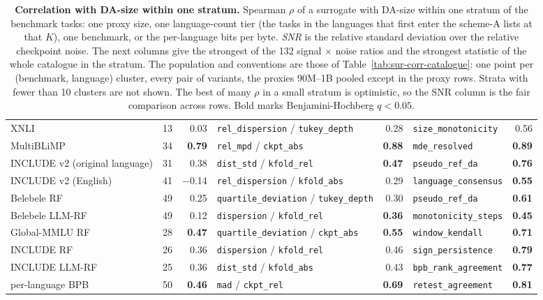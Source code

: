\begin{table}[t]
\begin{adjustbox}{max width=\textwidth}
\begin{tabular}{@{}lrrlrlr@{}}
XNLI & 13 & 0.03 & \texttt{rel\_dispersion} / \texttt{tukey\_depth} & 0.28 & \texttt{size\_monotonicity} & 0.56 \\
MultiBLiMP & 34 & \textbf{0.79} & \texttt{rel\_mpd} / \texttt{ckpt\_abs} & \textbf{0.88} & \texttt{mde\_resolved} & \textbf{0.89} \\
INCLUDE v2 (original language) & 31 & 0.38 & \texttt{dist\_std} / \texttt{kfold\_rel} & \textbf{0.47} & \texttt{pseudo\_ref\_da} & \textbf{0.76} \\
INCLUDE v2 (English) & 41 & $-$0.14 & \texttt{rel\_dispersion} / \texttt{kfold\_abs} & 0.29 & \texttt{language\_consensus} & \textbf{0.55} \\
Belebele RF & 49 & 0.25 & \texttt{quartile\_deviation} / \texttt{tukey\_depth} & 0.30 & \texttt{pseudo\_ref\_da} & \textbf{0.61} \\
Belebele LLM-RF & 49 & 0.12 & \texttt{dispersion} / \texttt{kfold\_rel} & \textbf{0.36} & \texttt{monotonicity\_steps} & \textbf{0.45} \\
Global-MMLU RF & 28 & \textbf{0.47} & \texttt{quartile\_deviation} / \texttt{ckpt\_abs} & \textbf{0.55} & \texttt{window\_kendall} & \textbf{0.71} \\
INCLUDE RF & 26 & 0.36 & \texttt{dispersion} / \texttt{kfold\_rel} & 0.46 & \texttt{sign\_persistence} & \textbf{0.79} \\
INCLUDE LLM-RF & 25 & 0.36 & \texttt{dist\_std} / \texttt{kfold\_abs} & 0.43 & \texttt{bpb\_rank\_agreement} & \textbf{0.77} \\
\midrule
per-language BPB & 50 & \textbf{0.46} & \texttt{mad} / \texttt{ckpt\_rel} & \textbf{0.69} & \texttt{retest\_agreement} & \textbf{0.81} \\
\bottomrule
\end{tabular}
\end{adjustbox}
\caption{\textbf{Correlation with DA-size within one stratum.} Spearman $\rho$ of a surrogate with DA-size within one stratum of the benchmark tasks: one proxy size, one language-count tier (the tasks in the languages that first enter the scheme-A lists at that $K$), one benchmark, or the per-language bits per byte. \emph{SNR} is the relative standard deviation over the relative checkpoint noise. The next columns give the strongest of the 132 signal $\times$ noise ratios and the strongest statistic of the whole catalogue in the stratum. The population and conventions are those of Table~\ref{tab:sur-corr-catalogue}: one point per (benchmark, language) cluster, every pair of variants, the proxies 90M--1B pooled except in the proxy rows. Strata with fewer than 10 clusters are not shown. The best of many $\rho$ in a small stratum is optimistic, so the SNR column is the fair comparison across rows. Bold marks Benjamini-Hochberg $q < 0.05$.}
\label{tab:sur-corr-strata}
\end{table}

